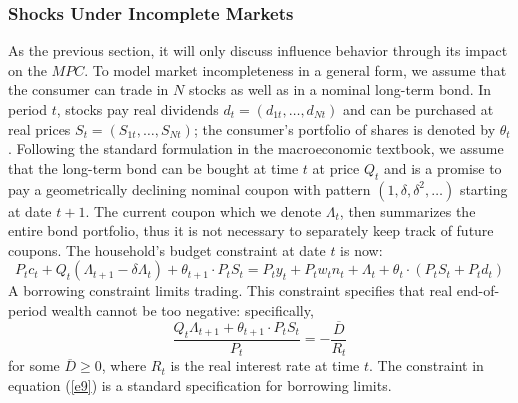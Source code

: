 \documentclass[11pt,letterpaper]{article}
\begin{document}
\subsubsection{Shocks Under Incomplete Markets}
As the previous section, it will only discuss influence behavior through its impact on the $MPC$. To model market incompleteness in a general form, we assume that the consumer can trade in $N$ stocks as well as in a nominal long-term bond. In period $t$, stocks pay real dividends $d_{t} = (d_{1t}, \ldots, d_{Nt})$ and can be purchased at real prices $S_{t} = (S_{1t}, \ldots, S_{Nt} )$; the consumer's portfolio of shares is denoted by $\theta_{t}$. Following the standard formulation in the macroeconomic textbook, we assume that the long-term bond can be bought at time $t$ at price $Q_{t}$ and is a promise to pay a geometrically declining nominal coupon with pattern $(1, \delta, \delta^{2}, \ldots)$ starting at date $t+1$. The current coupon which we denote $\Lambda_{t}$, then summarizes the entire bond portfolio, thus it is not necessary to separately keep track of future coupons. The household's budget constraint at date $t$ is now: 
\begin{equation}
	P_{t}c_{t} + Q_{t}(\Lambda_{t+1} - \delta \Lambda_{t}) + \theta_{t+1} \cdot P_{t}S_{t} = P_{t}y_{t} + P_{t}w_{t}n_{t} + \Lambda_{t} + \theta_{t} \cdot (P_{t}S_{t} + P_{t}d_{t})
\end{equation}
A borrowing constraint limits trading. This constraint specifies that real end-of-period wealth cannot be too negative: specifically,      
\begin{equation}\label{e9}
	\frac{Q_{t}\Lambda_{t+1} + \theta_{t+1} \cdot P_{t}S_{t}}{P_{t}} = - \frac{\overline{D}}{R_{t}}
\end{equation}
for some $\overline{D} \geq 0$, where $R_{t}$ is the real interest rate at time $t$. The constraint in equation (\ref{e9}) is a standard specification for borrowing limits. 
\end{document}
